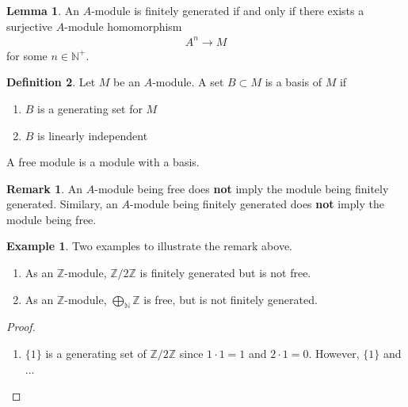 \documentclass[a4paper]{book}
\theoremstyle{definition}
\newtheorem{definition}{Definition}[]
\newtheorem{example}{Example}[definition]
\newtheorem{lemma}[definition]{Lemma}
\newtheorem*{remark}{Remark}
\begin{document}
\begin{thmbox}
    \begin{lemma}
        An \(A\)-module is finitely generated if and only if there exists a surjective \(A\)-module homomorphism
        \begin{align*}
            A^n \longrightarrow M
        \end{align*}
        for some \(n \in \mathbb{N}^+\).
    \end{lemma}
\end{thmbox}

\begin{defbox}
    \begin{definition}
        Let \(M\) be an \(A\)-module. A set \(B \subset M\) is a basis of \(M\) if
        \begin{enumerate}
            \item \(B\) is a generating set for \(M\)
            \item \(B\) is linearly independent
        \end{enumerate}
        A free module is a module with a basis.
    \end{definition}
\end{defbox}

\begin{rembox}
    \begin{remark}
        An \(A\)-module being free does \textbf{not} imply the module being finitely generated. Similary, an \(A\)-module being finitely generated does \textbf{not} imply the module being free.
    \end{remark}
\end{rembox}

\begin{exmbox}
    \begin{example}
        Two examples to illustrate the remark above.
        \begin{enumerate}
            \item As an \(\mathbb{Z}\)-module, \(\mathbb{Z} / 2 \mathbb{Z}\) is finitely generated but is not free.
            \item As an \(\mathbb{Z}\)-module, \(\bigoplus_{\mathbb{N}} \mathbb{Z}\) is free, but is not finitely generated.
        \end{enumerate}
    \end{example}
\end{exmbox}

\begin{proof}
    \begin{enumerate}
        \item \(\{1\}\) is a generating set of \(\mathbb{Z}/2\mathbb{Z}\) since \(1 \cdot 1 = 1\) and \(2 \cdot 1 = 0\). However, \(\{1\}\) and ...
    \end{enumerate}
\end{proof}
\end{document}
